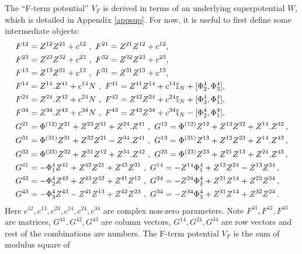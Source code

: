 \documentclass[12pt,a4paper]{JHEP3}
\newcommand{\nn}{\ensuremath{\nonumber{}}}
\begin{document}
The ``F-term potential'' $V_F$ is derived in terms of an underlying superpotential $W$, which is detailed in  Appendix \ref{appsup}.
For now, it is useful to first define some intermediate objects:
\begin{align}
\nn
F^{12} &=  Z^{12} Z^{21} + c^{12}   ~,~
F^{21} =  Z^{21} Z^{12} + c^{12} , \\
\nn
F^{23} &= Z^{23} Z^{32} + c^{23}  ~,~ 
F^{32} =  Z^{32} Z^{23} + c^{23}  , \\
\nn
F^{13} &=  Z^{13} Z^{31} + c^{13}   ~,~
F^{31} =  Z^{31} Z^{13} + c^{13}  , \\
\nn
F^{14} &= Z^{14}. Z^{41} + c^{14} N  ~,~
F^{41} =  Z^{41} Z^{14} + c^{14} \mathbb{I}_{N} + [\Phi_2^4, \Phi_3^4]  , \\
\nn
F^{24} &=  Z^{24}. Z^{42} + c^{24} N ~,~ 
F^{42} =  Z^{42} Z^{24} + c^{24} \mathbb{I}_{N} + [\Phi_3^4, \Phi_1^4]  , \\
\nn
F^{34} &=   Z^{34}. Z^{43} + c^{34} N  ~,~
F^{43} =  Z^{43} Z^{34} + c^{34} \mathbb{I}_{N} - [\Phi_2^4,\Phi_1^4] , \\
\nn
%
G^{21} &=  \Phi^{(12)}  Z^{21} + Z^{23} Z^{31} + Z^{24} . Z^{41}  ~,~ G^{12} =  \Phi^{(12)}  Z^{12} + Z^{13} Z^{32} + Z^{14} . Z^{42}  \, , \\
\nn
G^{31} &=  \Phi^{(31)} Z^{31}  + Z^{32} Z^{21} - Z^{34} . Z^{41}   ~,~ G^{13} =  \Phi^{(31)}  Z^{13}  + Z^{12} Z^{23} + Z^{14} . Z^{43} \, ,  \\
\nn
G^{32} &=  \Phi^{(23)} Z^{32}  + Z^{31} Z^{12} + Z^{34} . Z^{42}  ~,~ G^{23} = \Phi^{(23)} Z^{23} + Z^{21} Z^{13} + Z^{24} . Z^{43}  \, ,  \\
\nn
G^{41} &=   - \Phi_1^4 Z^{41} + Z^{42} Z^{21} + Z^{43} Z^{31}  ~,~ G^{14} =  - Z^{14} \Phi_1^4 + Z^{12} Z^{24} - Z^{13} Z^{34}  \, ,  \\
\nn
G^{42} &=  - \Phi_2^4 Z^{42} + Z^{43} Z^{32} + Z^{41} Z^{12}  ~,~ G^{24} = - Z^{24} \Phi_2^4 + Z^{21} Z^{14} + Z^{23} Z^{34}  \, ,  \\
G^{43} &=  - \Phi_3^4 Z^{43} - Z^{41} Z^{13} + Z^{42} Z^{23}   ~,~ G^{34} =  - Z^{34} \Phi_3^4 + Z^{31} Z^{14} + Z^{32} Z^{24}  \, . \label{Fterm}
\end{align}
Here $c^{12}, c^{13}, c^{23}, c^{14} , c^{24} , c^{34}$ are complex non-zero parameters. Note $F^{41}, F^{42}, F^{43}$ are matrices, $G^{41}, G^{42}, G^{43}$ are column vectors, $G^{14}, G^{24}, G^{34}$ are row vectors and rest of the combinations are numbers. The F-term potential $V_F$ is the  sum of modulus square of 
\end{document}
